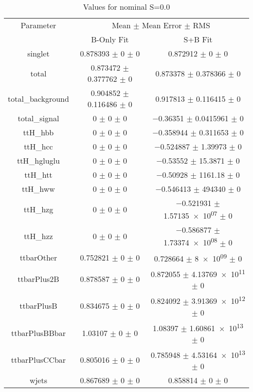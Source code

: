 \begin{table}
\centering
\caption{Values for nominal S=0.0}
\begin{tabular}{ccc}
\toprule
Parameter & \multicolumn{2}{c}{Mean $\pm$ Mean Error $\pm$ RMS}\\
 & B-Only Fit & S+B Fit\\
\midrule
singlet & \num{0.878393} $\pm$ \num{0} $\pm$ \num{0} & \num{0.872912} $\pm$ \num{0} $\pm$ \num{0}\\
total & \num{0.873472} $\pm$ \num{0.377762} $\pm$ \num{0} & \num{0.873378} $\pm$ \num{0.378366} $\pm$ \num{0}\\
total\_background & \num{0.904852} $\pm$ \num{0.116486} $\pm$ \num{0} & \num{0.917813} $\pm$ \num{0.116415} $\pm$ \num{0}\\
total\_signal & \num{0} $\pm$ \num{0} $\pm$ \num{0} & \num{-0.36351} $\pm$ \num{0.0415961} $\pm$ \num{0}\\
ttH\_hbb & \num{0} $\pm$ \num{0} $\pm$ \num{0} & \num{-0.358944} $\pm$ \num{0.311653} $\pm$ \num{0}\\
ttH\_hcc & \num{0} $\pm$ \num{0} $\pm$ \num{0} & \num{-0.524887} $\pm$ \num{1.39973} $\pm$ \num{0}\\
ttH\_hgluglu & \num{0} $\pm$ \num{0} $\pm$ \num{0} & \num{-0.53552} $\pm$ \num{15.3871} $\pm$ \num{0}\\
ttH\_htt & \num{0} $\pm$ \num{0} $\pm$ \num{0} & \num{-0.50928} $\pm$ \num{1161.18} $\pm$ \num{0}\\
ttH\_hww & \num{0} $\pm$ \num{0} $\pm$ \num{0} & \num{-0.546413} $\pm$ \num{494340} $\pm$ \num{0}\\
ttH\_hzg & \num{0} $\pm$ \num{0} $\pm$ \num{0} & \num{-0.521931} $\pm$ \num{1.57135e+07} $\pm$ \num{0}\\
ttH\_hzz & \num{0} $\pm$ \num{0} $\pm$ \num{0} & \num{-0.586877} $\pm$ \num{1.73374e+08} $\pm$ \num{0}\\
ttbarOther & \num{0.752821} $\pm$ \num{0} $\pm$ \num{0} & \num{0.728664} $\pm$ \num{8e+09} $\pm$ \num{0}\\
ttbarPlus2B & \num{0.878587} $\pm$ \num{0} $\pm$ \num{0} & \num{0.872055} $\pm$ \num{4.13769e+11} $\pm$ \num{0}\\
ttbarPlusB & \num{0.834675} $\pm$ \num{0} $\pm$ \num{0} & \num{0.824092} $\pm$ \num{3.91369e+12} $\pm$ \num{0}\\
ttbarPlusBBbar & \num{1.03107} $\pm$ \num{0} $\pm$ \num{0} & \num{1.08397} $\pm$ \num{1.60861e+13} $\pm$ \num{0}\\
ttbarPlusCCbar & \num{0.805016} $\pm$ \num{0} $\pm$ \num{0} & \num{0.785948} $\pm$ \num{4.53164e+13} $\pm$ \num{0}\\
wjets & \num{0.867689} $\pm$ \num{0} $\pm$ \num{0} & \num{0.858814} $\pm$ \num{0} $\pm$ \num{0}\\
\bottomrule
\end{tabular}
\end{table}